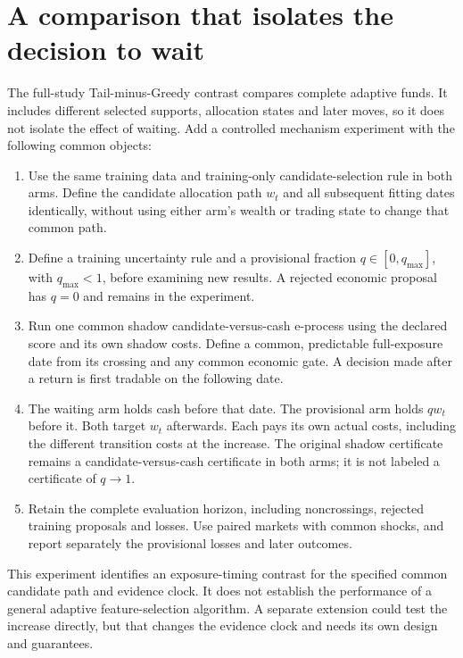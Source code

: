 \documentclass[11pt,a4paper]{article}
\begin{document}
\section{A comparison that isolates the decision to wait}
The full-study Tail-minus-Greedy contrast compares complete adaptive funds.
It includes different selected supports, allocation states and later moves,
so it does not isolate the effect of waiting. Add a controlled mechanism
experiment with the following common objects:
\begin{enumerate}
 \item Use the same training data and training-only candidate-selection rule
 in both arms. Define the candidate allocation path $w_t$ and all subsequent
 fitting dates identically, without using either arm's wealth or trading
 state to change that common path.
 \item Define a training uncertainty rule and a provisional fraction
 $q\in[0,q_{\max}]$, with $q_{\max}<1$, before examining new results.
 A rejected economic proposal has $q=0$ and remains in the experiment.
 \item Run one common shadow candidate-versus-cash e-process using the
 declared score and its own shadow costs. Define a common, predictable
 full-exposure date from its crossing and any common economic gate.
 A decision made after a return is first tradable on the following date.
 \item The waiting arm holds cash before that date. The provisional arm
 holds $qw_t$ before it. Both target $w_t$ afterwards. Each pays its own
 actual costs, including the different transition costs at the increase.
 The original shadow certificate remains a candidate-versus-cash
 certificate in both arms; it is not labeled a certificate of $q\to1$.
 \item Retain the complete evaluation horizon, including noncrossings,
 rejected training proposals and losses. Use paired markets with common
 shocks, and report separately the provisional losses and later outcomes.
\end{enumerate}
This experiment identifies an exposure-timing contrast for the specified
common candidate path and evidence clock. It does not establish the
performance of a general adaptive feature-selection algorithm. A separate
extension could test the increase directly, but that changes the evidence
clock and needs its own design and guarantees.
\end{document}
